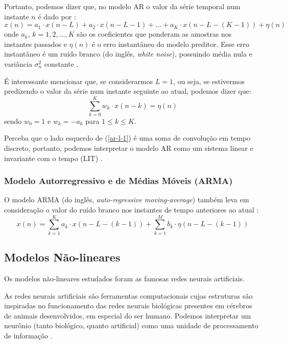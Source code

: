 \documentclass[a4paper, 12pt]{article}
\begin{document}
Portanto, podemos dizer que, no modelo AR o valor da série temporal num instante $n$ é dado por \cite{haykin2008adaptive}:
\begin{equation}
x(n) = a_{1} \cdot x(n - L) + a_{2} \cdot x(n - L - 1) + ... + a_{K} \cdot x(n - L - (K - 1)) + \eta (n)
\end{equation}
onde $a_{k}$, $k = 1, 2, ..., K$ são os coeficientes que ponderam as amostras nos instantes passados e $\eta (n)$ é o erro instantâneo do modelo preditor. Esse erro instantâneo é um ruído branco (do inglês, \textit{white noise}), possuindo média nula e variância $\sigma_{n}^2$ constante \cite{box2015time}.

É interessante mencionar que, se considerarmos $L = 1$, ou seja, se estivermos predizendo o valor da série num instante seguinte ao atual, podemos dizer que:
\begin{equation}\label{ar-l-1}
\sum_{k=0}^{K} w_{k} \cdot x(n - k) = \eta (n)
\end{equation}
sendo $w_{0} = 1$ e $w_{k} = -a_{k}$ para $1 \leq k \leq K$.

Perceba que o lado esquerdo de (\ref{ar-l-1}) é uma soma de convolução em tempo discreto, portanto, podemos interpretar o modelo AR como um sistema linear e invariante com o tempo (LIT) \cite{oppenheim2014signals}.

\subsubsection{Modelo Autorregressivo e de Médias Móveis (ARMA)}

O modelo ARMA (do inglês, \textit{auto-regressive moving-average}) também leva em consideração o valor do ruído branco nos instantes de tempo anteriores ao atual \cite{box2015time}:
\begin{equation}
x(n) = \sum_{k = 1}^{K} a_{k} \cdot x(n - L - (k-1)) + \sum_{k=1}^{M} b_{k} \cdot \eta(n - L - (k-1))
\end{equation} 


\subsection{Modelos Não-lineares}

Os modelos não-lineares estudados foram as famosas redes neurais artificiais.

As redes neurais artificiais são ferramentas computacionais cujas estruturas são inspiradas no funcionamento das redes neurais biológicas presentes em cérebros de animais desenvolvidos, em especial do ser humano. Podemos interpretar um neurônio (tanto biológico, quanto artificial) como uma unidade de processamento de informação \cite{haykin2010neural}. 
\end{document}
